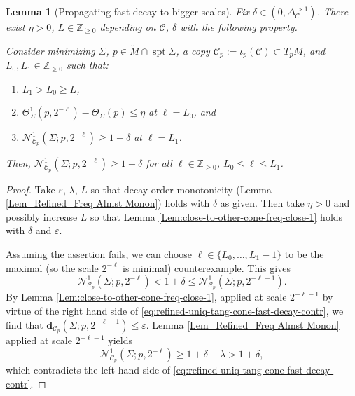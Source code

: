 \documentclass[11pt, letterpaper, reqno]{amsart}
\numberwithin{equation}{section}
\newtheorem{Lem}[Def]{Lemma}
\theoremstyle{remark}
\newcommand{\ZZ}{\mathbb{Z}}
\newcommand{\cC}{\mathcal{C}}
\newcommand{\cN}{\mathcal{N}}
\newcommand{\mbfd}{\mathbf{d}}
\newcommand{\spt}{\operatorname{spt}}
\newcommand{\eps}{\varepsilon}
\begin{document}
\begin{Lem}[Propagating fast decay to bigger scales]\label{Lem_Refined_Uniq tang cone if limsup N(Sigma, tau)>1}
Fix $\delta \in (0, \Delta_\cC^{>1})$. There exist $\eta>0$, $L\in\ZZ_{\geq 0}$ depending on $\cC$, $\delta$ with the following property. 

Consider minimizing $\Sigma$, $p \in \breve M \cap \spt \Sigma$, a copy $\cC_p := \iota_p(\cC) \subset T_p M$, and $L_0, L_1 \in \ZZ_{\geq 0}$ such that: 
\begin{enumerate}
\item $L_1 > L_0 \geq L$,
\item $\Theta^{1}_{\Sigma}(p,2^{-\ell}) - \Theta_\Sigma(p) \leq \eta$ at $\ell = L_0$, and
\item $\cN^{1}_{\cC_p}(\Sigma;p,2^{-\ell})\geq 1+\delta$ at $\ell = L_1$. 
\end{enumerate}
Then, $\cN^{1}_{\cC_p}(\Sigma;p,2^{-\ell}) \geq 1+ \delta$ for all $\ell \in \ZZ_{\geq 0}$, $L_0 \leq \ell \leq L_1$.
\end{Lem}
\begin{proof}
Take $\eps$, $\lambda$, $L$ so that decay order monotonicity (Lemma \ref{Lem_Refined_Freq Almst Monon}) holds with $\delta$ as given. Then take $\eta > 0$ and possibly increase $L$ so that Lemma \ref{Lem:close-to-other-cone-freq-close-1} holds with $\delta$ and $\eps$. 


Assuming the assertion fails, we can choose $\ell \in \{L_0, \dots,L_1-1\}$ to be the maximal (so the scale $2^{-\ell}$ is minimal) counterexample. This gives
\begin{equation} \label{eq:refined-uniq-tang-cone-fast-decay-contr}
	\cN^{1}_{\cC_p}(\Sigma;p,2^{-\ell}) < 1 + \delta \leq \cN^{1}_{\cC_p}(\Sigma;p,2^{-\ell-1}).
\end{equation}
By Lemma \ref{Lem:close-to-other-cone-freq-close-1}, applied at scale $2^{-\ell-1}$ by virtue of the right hand side of \eqref{eq:refined-uniq-tang-cone-fast-decay-contr}, we find that $\mbfd_{\cC_p}(\Sigma;p,2^{-\ell-1})\leq \eps$. Lemma \ref{Lem_Refined_Freq Almst Monon} applied at scale $2^{-\ell-1}$ yields
\[
\cN^{1}_{\cC_p}(\Sigma;p,2^{-\ell}) \geq 1 + \delta + \lambda > 1 + \delta,
\]
which contradicts the left hand side of \eqref{eq:refined-uniq-tang-cone-fast-decay-contr}.
\end{proof}
\end{document}
